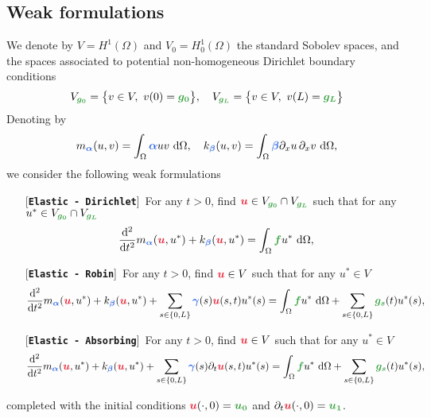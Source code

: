 \documentclass[11pt,a4paper]{article}
\newcommand{\unknown}[1]{\bm{{\color{myred}{#1}}}}
\newcommand{\param}[1]{\bm{{\color{myhyperblue}{#1}}}}
\newcommand{\data}[1]{\bm{{\color{mygreen}{#1}}}}
\newcommand{\keyword}[1]{[\texttt{\textbf{#1}}]\!\,}
\begin{document}
\subsection{Weak formulations}
We denote by $V = H^1(\Omega)$ and $V_0 = H^1_0(\Omega)$ the standard Sobolev spaces, and the spaces associated to potential non-homogeneous Dirichlet boundary conditions
\begin{equation*}
V_{\data{g_0}} = \big\{v \in V,~v(0) = \data{g_0}\big\},\quad V_{\data{g_L}} = \big\{v \in V,~v(L) = \data{g_L}\big\}
\end{equation*}
Denoting by
\begin{equation*}
m_{\param{\alpha}}(u, v) = \int_\Omega \param{\alpha} u v~\mathrm{d}\Omega, \quad k_{\param{\beta}}(u, v) = \int_\Omega \param{\beta} \partial_xu \,\partial_x v~\mathrm{d}\Omega,
\end{equation*}
we consider the following weak formulations
\begin{itemize}
\item[] \keyword{Elastic - Dirichlet} For any $t > 0$, find $\unknown{u}\in V_{\data{g_0}} \cap V_{\data{g_L}}$ such that for any $u^* \in V_{\data{g_0}} \cap V_{\data{g_L}}$
\begin{equation*}
\dfrac{\mathrm{d}^2}{\mathrm{d}t^2} m_{\param{\alpha}}(\unknown{u}, u^*) +
k_{\param{\beta}} (\unknown{u}, u^*) = \int_\Omega \data{f}u^*~\mathrm{d}\Omega, 
\end{equation*}
\item[] \keyword{Elastic - Robin} For any $t > 0$, find $\unknown{u}\in V$ such that for any $u^* \in V$
\begin{equation*}
\dfrac{\mathrm{d}^2}{\mathrm{d}t^2} m_{\param{\alpha}}(\unknown{u}, u^*) +
k_{\param{\beta}} (\unknown{u}, u^*)  + \sum_{s\in\{0, L\}}\param{\gamma}(s)\unknown{u}(s, t)u^*(s) = \int_\Omega \data{f}u^*~\mathrm{d}\Omega + \sum_{s\in\{0, L\}}\data{g_s}(t)u^*(s), 
\end{equation*}
\item[] \keyword{Elastic - Absorbing} For any $t > 0$, find $\unknown{u}\in V$ such that for any $u^* \in V$
\begin{equation*}
\dfrac{\mathrm{d}^2}{\mathrm{d}t^2} m_{\param{\alpha}}(\unknown{u}, u^*) +
k_{\param{\beta}} (\unknown{u}, u^*)  + \sum_{s\in\{0, L\}}\param{\gamma}(s)\partial_t\unknown{u}(s, t)u^*(s) = \int_\Omega \data{f}u^*~\mathrm{d}\Omega + \sum_{s\in\{0, L\}}\data{g_s}(t)u^*(s), 
\end{equation*}
\end{itemize}
completed with the initial conditions $\unknown{u}(\cdot, 0) = \data{u_0}$ and $\partial_t\unknown{u}(\cdot, 0) = \data{u_1}$. 
\end{document}
